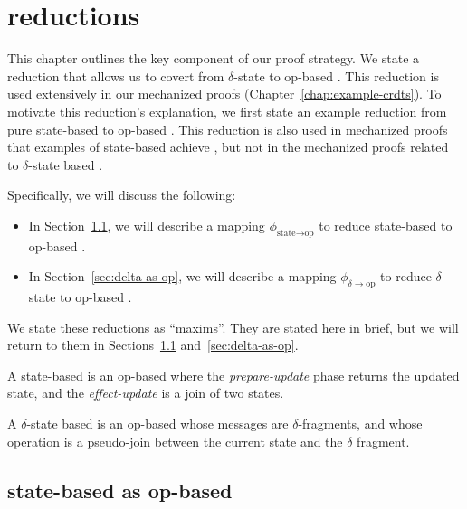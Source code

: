 \chapter{\CRDT reductions}
\label{chap:crdt-reductions}

This chapter outlines the key component of our proof strategy. We state a
reduction that allows us to covert from $\delta$-state to op-based \CRDTs. This
reduction is used extensively in our mechanized proofs
(Chapter~\ref{chap:example-crdts}). To motivate this reduction's explanation, we
first state an example reduction from pure state-based \CRDTs to op-based
\CRDTs. This reduction is also used in mechanized proofs that examples of
state-based \CRDTs achieve \SEC, but not in the mechanized proofs related to
$\delta$-state based \CRDTs.

Specifically, we will discuss the following:
\begin{itemize}
  \item In Section~\ref{sec:state-as-op}, we will describe a mapping
    $\phi_{\text{state} \to \text{op}}$ to reduce state-based \CRDTs to op-based
    \CRDTs.
  \item In Section~\ref{sec:delta-as-op}, we will describe a mapping
    $\phi_{\delta \to \text{op}}$ to reduce $\delta$-state \CRDTs to op-based
    \CRDTs.
\end{itemize}

We state these reductions as ``maxims''. They are stated here in brief, but we
will return to them in Sections~\ref{sec:state-as-op} and~\ref{sec:delta-as-op}.

\begin{maxim}
  \label{maxim:state-as-op}
  A state-based \CRDT is an op-based \CRDT where the \emph{prepare-update} phase
  returns the updated state, and the \emph{effect-update} is a join of two
  states.
\end{maxim}

\begin{maxim}
  \label{maxim:delta-as-op}
  A $\delta$-state based \CRDT is an op-based \CRDT whose messages are
  $\delta$-fragments, and whose operation is a pseudo-join between the current
  state and the $\delta$ fragment.
\end{maxim}

\section{state-based \CRDTs as op-based}
\label{sec:state-as-op}

